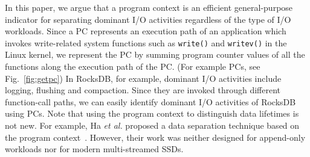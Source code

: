In this paper, 
we argue that a program context 
is an efficient  general-purpose indicator for 
separating dominant I/O activities regardless of the type of I/O workloads. 
Since a PC represents an execution path of an application which invokes 
write-related system functions such as {\tt write()} and {\tt writev()} 
in the Linux kernel,  
we represent the PC by summing program counter values of all the functions 
along the execution path of the PC. (For example PCs, see Fig.~\ref{fig:getpc})
In RocksDB, for example, dominant I/O activities include logging, 
flushing and compaction.  
Since they are invoked through different function-call paths, 
we can easily identify dominant I/O activities of RocksDB using PCs. 
Note that using the program context to distinguish data lifetimes is not new.  
For example, Ha {\it et al.} proposed a data separation 
technique based on the program context~\cite{PCHa}.   
However, their work was neither designed for append-only 
workloads nor for modern multi-streamed SSDs.

